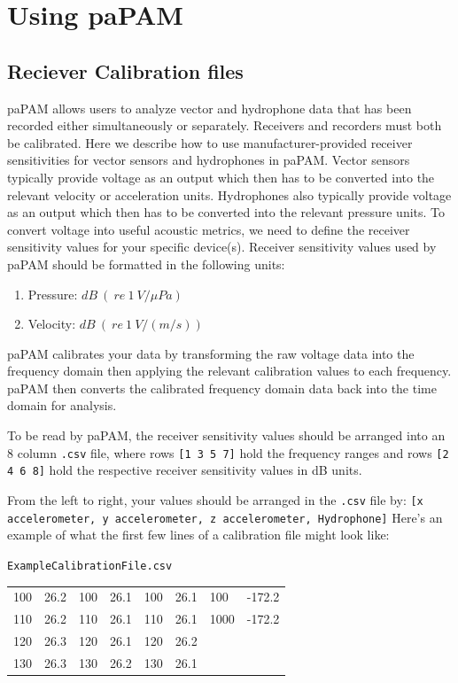 \documentclass[11pt]{report}
\begin{document}
\chapter{Using paPAM}

\section{Reciever Calibration files} \label{CalibrationFiles}

paPAM allows users to analyze vector and hydrophone data that has been recorded either simultaneously or separately. Receivers and recorders must both be calibrated.  Here we describe how to use manufacturer-provided receiver sensitivities for vector sensors and hydrophones in paPAM.  Vector sensors typically provide voltage as an output which then has to be converted into the relevant velocity or acceleration units.  Hydrophones also typically provide voltage as an output which then has to be converted into the relevant pressure units.  To convert voltage into useful acoustic metrics, we need to define the receiver sensitivity values for your specific device(s).  Receiver sensitivity values used by paPAM should be formatted in the following units:

\begin{enumerate}
	\item Pressure: $ \mathit{dB}\ (\ \mathit{re\ 1\ V/\mu Pa})$
	\item Velocity: $\mathit{dB} \ (\ \mathit{re\ 1\ V/\left(m/s\right)})$
\end{enumerate}

paPAM calibrates your data by transforming the raw voltage data into the frequency domain then applying the relevant calibration values to each frequency.  paPAM then converts the calibrated frequency domain data back into the time domain for analysis.

To be read by paPAM, the receiver sensitivity values should be arranged into an 8 column \texttt{.csv} file, where rows \texttt{[1 3 5 7]} hold the frequency ranges and rows \texttt{[2 4 6 8]} hold the respective receiver sensitivity values in dB units.

\begin{samepage}

 From the left to right, your values should be arranged in the \texttt{.csv} file by: \texttt{[x accelerometer, y accelerometer, z accelerometer, Hydrophone]}
Here's an example of what the first few lines of a calibration file might look like:

\texttt{ExampleCalibrationFile.csv}\\
\begin{tabular}{l l l l l l l l}
\hline
100 & 26.2 & 100 & 26.1 & 100 & 26.1 & 100 & -172.2 \\
110 & 26.2 & 110 & 26.1 & 110 & 26.1 & 1000 & -172.2 \\
120 & 26.3 & 120 & 26.1 & 120 & 26.2\\
130 & 26.3 & 130 & 26.2 & 130 & 26.1\\
\hline
\end{tabular}
\end{samepage}\\
\end{document}
